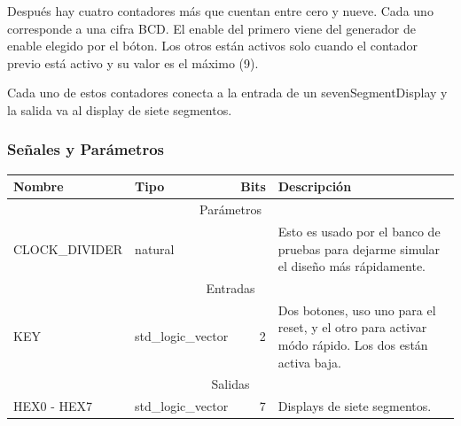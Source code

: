 \documentclass[a4paper]{article}
\begin{document}
Después hay cuatro contadores más que cuentan entre cero y nueve. Cada uno corresponde a una cifra BCD. El enable del primero viene del generador de enable elegido por el bóton. Los otros están activos solo cuando el contador previo está activo y su valor es el máximo (9).

Cada uno de estos contadores conecta a la entrada de un sevenSegmentDisplay y la salida va al display de siete segmentos.

\subsubsection{Señales y Parámetros}

\begin{tabular}{| l | l | r | p{8cm} |}
\hline
\textbf{Nombre} & \textbf{Tipo} & \textbf{Bits} & \textbf{Descripción} \\ \hline
\multicolumn{4}{|c|}{Parámetros} \\ \hline
CLOCK\_DIVIDER & natural & & Esto es usado por el banco de pruebas para dejarme simular el diseño más rápidamente. \\ \hline
\multicolumn{4}{|c|}{Entradas} \\ \hline
KEY & std\_logic\_vector & 2 & Dos botones, uso uno para el reset, y el otro para activar módo rápido. Los dos están activa baja. \\ \hline
\multicolumn{4}{|c|}{Salidas} \\ \hline
HEX0 - HEX7 & std\_logic\_vector & 7 & Displays de siete segmentos. \\
\hline
\end{tabular}
\end{document}
